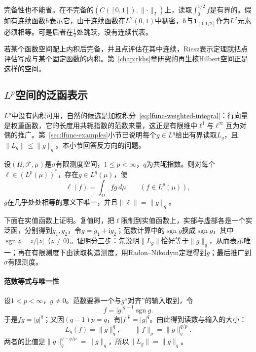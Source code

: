 完备性也不能省。在不完备的$(C([0,1]),\lVert\cdot\rVert_2)$上，读取$\int_0^{1/2}f$是有界的。假如有连续函数$h$表示它，由于连续函数在$L^2(0,1)$中稠密，$h$与$\mathbf{1}_{[0,1/2]}$作为$L^2$元素必须相等。可是后者在$\tfrac12$处跳跃，没有连续代表。

若某个函数空间配上内积后完备，并且点评估在其中连续，Riesz表示定理就把点评估写成与某个固定函数的内积。第~\ref{chap:rkhs}章研究的再生核Hilbert空间正是这样的空间。

\subsection{\texorpdfstring{$L^p$}{Lp}空间的泛函表示}
\label{sec:lfunc-lp-dual}

$L^p$中没有内积可用，自然的候选是加权积分~\eqref{eq:lfunc-weighted-integral}：行向量是权重函数，它的长度用共轭指数的范数来量，这正是有限维中$\ell^1$与$\ell^\infty$互为对偶的推广。第~\ref{sec:lfunc-examples}小节已说明每个$g\in L^q$给出有界读取$L_g$，且$\lVert L_g\rVert\leq\lVert g\rVert_q$。本小节回答反方向的问题。

\begin{theorem}[$L^p$的对偶表示]
\label{thm:lfunc-lp-dual}
设$(\Omega,\mathcal F,\mu)$是$\sigma$有限测度空间，$1\leq p<\infty$，$q$为共轭指数。则对每个$\ell\in(L^p(\mu))^*$，存在$g\in L^q(\mu)$，使
\begin{equation}
\ell(f)=\int_\Omega fg\,d\mu\qquad(f\in L^p(\mu)),
\label{eq:lfunc-lp-dual}
\end{equation}
$g$在几乎处处相等的意义下唯一，并且$\lVert\ell\rVert=\lVert g\rVert_q$。
\end{theorem}

下面在实值函数上证明。复值时，把$\ell$限制到实值函数上，实部与虚部各是一个实泛函，分别得到$g_1,g_2$，令$g=g_1+\mathrm ig_2$；范数计算中的$\operatorname{sgn}g$换成$\overline{\operatorname{sgn}g}$，其中$\operatorname{sgn}z=z/\lvert z\rvert$（$z\neq0$）。证明分三步：先说明$\lVert L_g\rVert$恰好等于$\lVert g\rVert_q$，从而表示唯一；再在有限测度下由读取构造测度，用Radon--Nikodym定理得到$g$；最后推广到$\sigma$有限测度。

\paragraph{范数等式与唯一性}
设$1<p<\infty$，$g\neq0$。范数要靠一个与$g$“对齐”的输入取到，令
\[
f=\lvert g\rvert^{q-1}\operatorname{sgn}g .
\]
于是$fg=\lvert g\rvert^q$；又因$(q-1)p=q$，有$\lvert f\rvert^p=\lvert g\rvert^q$。由此得到读数与输入的大小：
\[
L_g(f)=\lVert g\rVert_q^{q},\qquad \lVert f\rVert_p=\lVert g\rVert_q^{q/p}.
\]
两者的比值是$\lVert g\rVert_q^{q-q/p}=\lVert g\rVert_q$，所以$\lVert L_g\rVert=\lVert g\rVert_q$。

